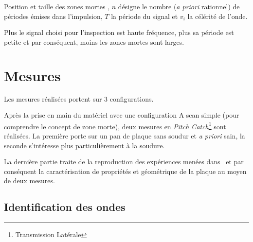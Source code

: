 \begin{figurehere}
    \centering
    \caption{Position et taille des zones mortes , $n$ désigne le nombre (\textit{a priori} rationnel) de périodes émises dans l'impulsion, $T$ la période du signal et $v_i$ la célérité de l'onde.}
    \label{tofd:deadzones}
\end{figurehere}

Plus le signal choisi pour l'inspection est haute fréquence, plus sa période est petite et par conséquent, moins les zones mortes sont larges.

\section{Mesures}

Les mesures réalisées portent sur 3 configurations.

Après la prise en main du matériel avec une configuration A scan simple (pour comprendre le concept de zone morte), deux mesures en \textit{Pitch Catch}\footnote{Transmission Latérale} sont réalisées. La première porte sur un pan de plaque sans soudur et \textit{a priori} sain, la seconde s'intéresse plus particulièrement à la soudure.

La dernière partie traite de la reproduction des expériences menées
dans~\autocite{kim_simultaneous_2003} et par conséquent la caractérisation de propriétés et géométrique de la plaque au moyen de deux mesures.

\subsection{Identification des ondes}

